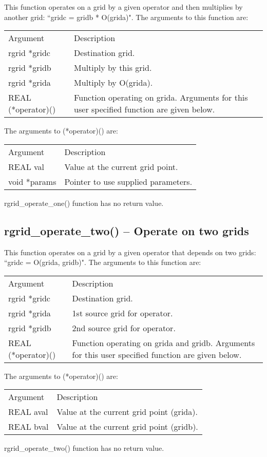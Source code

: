 \documentclass[12pt,letterpaper]{report}
\begin{document}
This function  operates on a grid by a given operator and then multiplies by another grid: ``gridc = gridb * O(grida)". The arguments to this function are:
\begin{longtable}{p{} p{}}
Argument & Description\\
\cline{1-2}
rgrid *gridc & Destination grid.\\
rgrid *gridb & Multiply by this grid.\\
rgrid *grida & Multiply by O(grida).\\
REAL (*operator)() & Function operating on grida. Arguments for this user specified function are given below.\\
\end{longtable}
The arguments to (*operator)() are:
\begin{longtable}{p{} p{}}
Argument & Description\\
\cline{1-2}
REAL val & Value at the current grid point.\\
void *params & Pointer to use supplied parameters.\\
\end{longtable}
\noindent
rgrid\_operate\_one() function has no return value.

\subsection{rgrid\_operate\_two() -- Operate on two grids}

This function  operates on a grid by a given operator that depends on two grids: ``gridc = O(grida, gridb)". The arguments to this function are:
\begin{longtable}{p{} p{}}
Argument & Description\\
\cline{1-2}
rgrid *gridc & Destination grid.\\
rgrid *grida & 1st source grid for operator.\\
rgrid *gridb & 2nd source grid for operator.\\
REAL (*operator)() & Function operating on grida and gridb. Arguments for this user specified function are given below.\\
\end{longtable}
The arguments to (*operator)() are:
\begin{longtable}{p{} p{}}
Argument & Description\\
\cline{1-2}
REAL aval & Value at the current grid point (grida).\\
REAL bval & Value at the current grid point (gridb).\\
\end{longtable}
\noindent
rgrid\_operate\_two() function has no return value.
\end{document}
